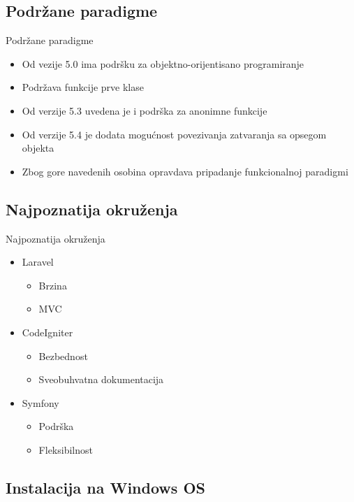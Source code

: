 \documentclass{beamer}
\begin{document}
\subsection{Podržane paradigme}
\begin{frame}{Podržane paradigme}
     	\begin{itemize}
		\item Od vezije 5.0 ima podršku za objektno-orijentisano programiranje  
		\item Podržava funkcije prve klase
		\item Od verzije 5.3 uvedena je i podrška za anonimne funkcije	
		\item Od verzije 5.4 je dodata mogućnost povezivanja zatvaranja sa opsegom objekta
		\item Zbog gore navedenih osobina opravdava pripadanje funkcionalnoj paradigmi
	\end{itemize}
\end{frame}


\subsection{Najpoznatija okruženja}
\begin{frame}{Najpoznatija okruženja}
    	\begin{itemize}
		\item Laravel
			\begin{itemize}
				\item Brzina
				\item MVC
			\end{itemize}
		\item CodeIgniter
			\begin{itemize}
				\item Bezbednost
				\item Sveobuhvatna dokumentacija
			\end{itemize}
		\item Symfony
			\begin{itemize}
				\item Podrška
				\item Fleksibilnost
			\end{itemize}
	\end{itemize}
\end{frame}

\subsection{Instalacija na Windows OS}
\end{document}
